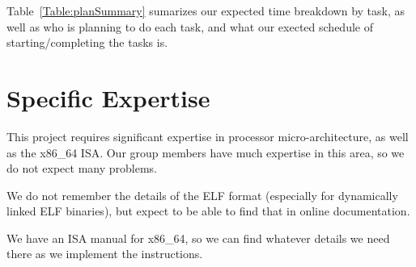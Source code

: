 \documentclass[12pt]{article}
\begin{document}
Table~\ref{Table:planSummary} sumarizes our expected time breakdown by task, as well as who is planning to do each task, and what our exected schedule of starting/completing the tasks is.


\section{Specific Expertise}
% 

This project requires significant expertise in processor
micro-architecture, as well as the x86\_64 ISA.  Our group members
have much expertise in this area, so we do not expect many problems.

We do not remember the details of the ELF format (especially for
dynamically linked ELF binaries), but expect to be able to find that 
in online documentation.

We have an ISA manual for x86\_64, so we can find whatever details
we need there as we implement the instructions.
\end{document}
